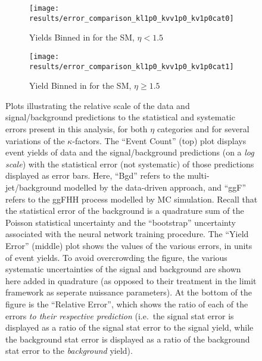     \begin{figure}
        \centering
        \begin{subfigure}{0.48\textwidth} 
            \texttt{[image: results/error\_comparison\_kl1p0\_kvv1p0\_kv1p0cat0]}
            \caption{Yields Binned in \mhh for the SM, $\eta < 1.5$}
            \label{fig:error_dump_eta0_1p00_1p00_1p00}
        \end{subfigure}
        \begin{subfigure}{0.48\textwidth}
            \texttt{[image: results/error\_comparison\_kl1p0\_kvv1p0\_kv1p0cat1]}
            \caption{Yield Binned in \deta for the SM, $\eta \geq 1.5$}
            \label{fig:error_dump_eta1_hh_1p00_1p00_1p00}
        \end{subfigure}
        \caption{
            \scriptsize
            Plots illustrating the relative scale of the data and signal/background predictions
                to the statistical and systematic errors present in this analysis,
                for both $\eta$ categories and for several variations of the $\kappa$-factors.
            The ``Event Count'' (top) plot displays event yields of data and the signal/background predictions
                (on a \textit{log scale})
                with the statistical error (not systematic) of those predictions displayed as error bars.
            Here, ``Bgd'' refers to the multi-jet/\ttbar background modelled by the data-driven approach,
                and ``ggF'' refers to the ggF\to HH process modelled by MC simulation.
            Recall that the statistical error of the background is a quadrature sum of the Poisson statistical uncertainty
                and the ``bootstrap'' uncertainty associated with the neural network training procedure.
            The ``Yield Error'' (middle) plot shows the values of the various errors, in units of event yields.
            To avoid overcrowding the figure, the various systematic uncertainties of the signal and background
                are shown here added in quadrature
                (as opposed to their treatment in the limit framework as seperate nuissance parameters).
            At the bottom of the figure is the ``Relative Error'', which shows the ratio of each of the errors
                \textit{to their respective prediction}
                (i.e.\ the signal stat error is displayed as a ratio of the signal stat error to the signal yield,
                while the background stat error is displayed as a ratio of the background stat error to the \textit{background} yield).
        }
        \label{fig:error_dump_sm}
    \end{figure}

